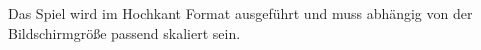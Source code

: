 Das Spiel wird im Hochkant Format ausgeführt und \gls{muss} abhängig von der Bildschirmgröße passend skaliert sein. 